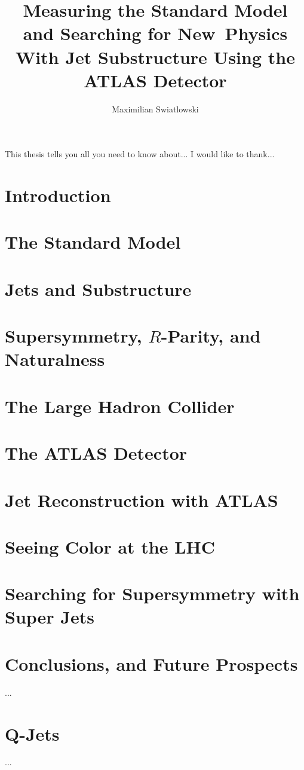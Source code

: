\documentclass{report}
\begin{document}
\title{Measuring the Standard Model and Searching for New~Physics 
        With Jet Substructure Using the ATLAS Detector}
\author{Maximilian Swiatlowski}

 
\beforepreface
{}
    This thesis tells you all you need to know about...
    I would like to thank...
\afterpreface
 
\chapter{Introduction}


\chapter{The Standard Model}



\chapter{Jets and Substructure}


\chapter{Supersymmetry, $R$-Parity, and Naturalness}



\chapter{The Large Hadron Collider}

		

\chapter{The ATLAS Detector}



\chapter{Jet Reconstruction with ATLAS}


\chapter{Seeing Color at the LHC}


\chapter{Searching for Supersymmetry with Super Jets}



\chapter{Conclusions, and Future Prospects}
         ...
\appendix
\chapter{Q-Jets}
         ...


\end{document}
